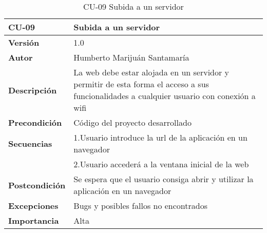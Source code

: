 \begin{table}[th!]
\begin{tabular}{  m{5cm}  m{7cm}  }
\hline \textbf{CU-09} & \textbf{Subida a un servidor} \\ 
\hline
\textbf{Versión} & 1.0\\
\textbf{Autor} & Humberto Marijuán Santamaría\\
\textbf{Descripción} & La web debe estar alojada en un servidor y permitir de esta forma el acceso a sus funcionalidades a cualquier usuario con conexión a wifi \\
\textbf{Precondición} & Código del proyecto desarrollado\\
\textbf{Secuencias} & 1.Usuario introduce la url de la aplicación en un navegador \\
                    & 2.Usuario accederá a la ventana inicial de la web \\
\textbf{Postcondición} & Se espera que el usuario consiga abrir y utilizar la aplicación en un navegador\\
\textbf{Excepciones} & Bugs y posibles fallos no encontrados\\
\textbf{Importancia} & Alta\\
\hline
\end{tabular}
\caption{CU-09 Subida a un servidor}
\label{ref:tablacu_09}
\end{table}




